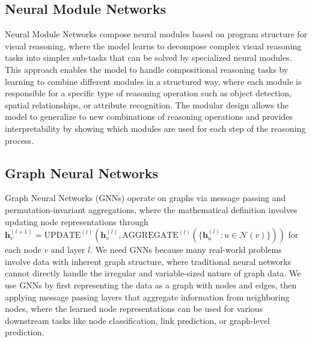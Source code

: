 \subsection{Neural Module Networks}

Neural Module Networks compose neural modules based on program structure for visual reasoning, where the model learns to decompose complex visual reasoning tasks into simpler sub-tasks that can be solved by specialized neural modules. This approach enables the model to handle compositional reasoning tasks by learning to combine different modules in a structured way, where each module is responsible for a specific type of reasoning operation such as object detection, spatial relationships, or attribute recognition. The modular design allows the model to generalize to new combinations of reasoning operations and provides interpretability by showing which modules are used for each step of the reasoning process.

\subsection{Graph Neural Networks}

Graph Neural Networks (GNNs) operate on graphs via message passing and permutation-invariant aggregations, where the mathematical definition involves updating node representations through $\mathbf{h}_v^{(l+1)} = \text{UPDATE}^{(l)}(\mathbf{h}_v^{(l)}, \text{AGGREGATE}^{(l)}(\{\mathbf{h}_u^{(l)} : u \in \mathcal{N}(v)\}))$ for each node $v$ and layer $l$. We need GNNs because many real-world problems involve data with inherent graph structure, where traditional neural networks cannot directly handle the irregular and variable-sized nature of graph data. We use GNNs by first representing the data as a graph with nodes and edges, then applying message passing layers that aggregate information from neighboring nodes, where the learned node representations can be used for various downstream tasks like node classification, link prediction, or graph-level prediction.


